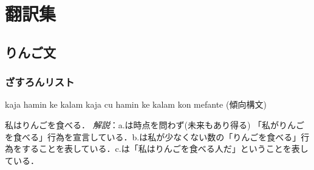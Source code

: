 \documentclass[../../main-detail.tex]{subfiles}
\begin{document}
\chapter{翻訳集}
\section{りんご文}
\subsection{ざすろんリスト}
\begin{exe}
    \ex \begin{xlist}
        \ex kaja hamin ke kalam
        \ex kaja cu hamin ke kalam kon mefante
        \ex (傾向構文)
    \end{xlist}
    \glt 私はりんごを食べる．
    \glt \emph{解説}：a.は時点を問わず(未来もあり得る) 「私がりんごを食べる」行為を宣言している．b.は私が少なくない数の「りんごを食べる」行為をすることを表している．c.は「私はりんごを食べる人だ」ということを表している．
\end{exe}
\end{document}
